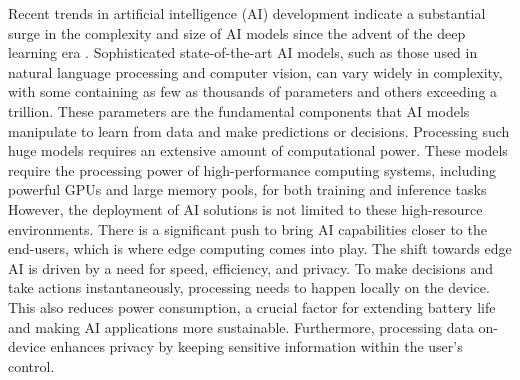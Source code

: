 Recent trends in artificial intelligence (AI) development indicate a substantial surge in the complexity and size of AI models since the advent of the deep learning era \autocite{EpochNotableModels2024}.
Sophisticated state-of-the-art AI models, such as those used in natural language processing and computer vision, can vary widely in complexity, with some containing as few as thousands of parameters and others exceeding a trillion.
These parameters are the fundamental components that AI models manipulate to learn from data and make predictions or decisions.
Processing such huge models requires an extensive amount of computational power.
These models require the processing power of high-performance computing systems, including powerful GPUs and large memory pools, for both training and inference tasks
However, the deployment of AI solutions is not limited to these high-resource environments.
There is a significant push to bring AI capabilities closer to the end-users, which is where edge computing comes into play.
The shift towards edge AI is driven by a need for speed, efficiency, and privacy. 
To make decisions and take actions instantaneously, processing needs to happen locally on the device.
This also reduces power consumption, a crucial factor for extending battery life and making AI applications more sustainable. 
Furthermore, processing data on-device enhances privacy by keeping sensitive information within the user's control.
